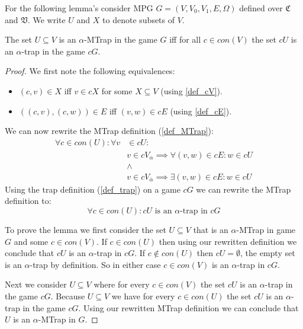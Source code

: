 
For the following lemma's consider MPG $G = (V,V_0,V_1,E,\Omega)$ defined over $\mathfrak{C}$ and $\mathfrak{V}$. We write $U$ and $X$ to denote subsets of $V$.
\begin{lemma}
	\label{lem_MPG_MTrap_is_trap}
	The set $U \subseteq V$ is an $\alpha$-MTrap in the game $G$ iff for all $c \in con(V)$ the set $cU$ is an $\alpha$-trap in the game $cG$.
	\begin{proof}
		We first note the following equivalences:
		\begin{itemize}
			\item $(c,v) \in X$ iff $v \in cX$ for some $X \subseteq V$ (using \ref{def_cV}).
			\item $((c,v),(c,w)) \in E$ iff $(v,w) \in cE$ (using \ref{def_cE}).
		\end{itemize}
		We can now rewrite the MTrap definition (\ref{def_MTrap}):
		\begin{align*}
		\forall c \in con(U):\forall v &\in cU:\\
		&v \in cV_\alpha \implies \forall(v,w) \in cE : w \in cU\\
		&\wedge\\
		&v \in cV_{\overline{\alpha}} \implies \exists (v,w) \in cE : w \in cU
		\end{align*}
		Using the trap definition (\ref{def_trap}) on a game $cG$ we can rewrite the MTrap definition to:
		\[ \forall c \in con(U): cU\text{ is an $\alpha$-trap in $cG$} \]
		
		To prove the lemma we first consider the set $U \subseteq V$ that is an $\alpha$-MTrap in game $G$ and some $c \in con(V)$. If $c \in con(U)$ then using our rewritten definition we conclude that $cU$ is an $\alpha$-trap in $cG$. If $c \notin con(U)$ then $cU = \emptyset$, the empty set is an $\alpha$-trap by definition. So in either case $c \in con(V)$ is an $\alpha$-trap in $cG$.
		
		Next we consider $U \subseteq V$ where for every $c \in con(V)$ the set $cU$ is an $\alpha$-trap in the game $cG$. Because $U \subseteq V$ we have for every $c \in con(U)$ the set $cU$ is an $\alpha$-trap in the game $cG$. Using our rewritten MTrap definition we can conclude that $U$ is an $\alpha$-MTrap in $G$.
	\end{proof}
\end{lemma}

